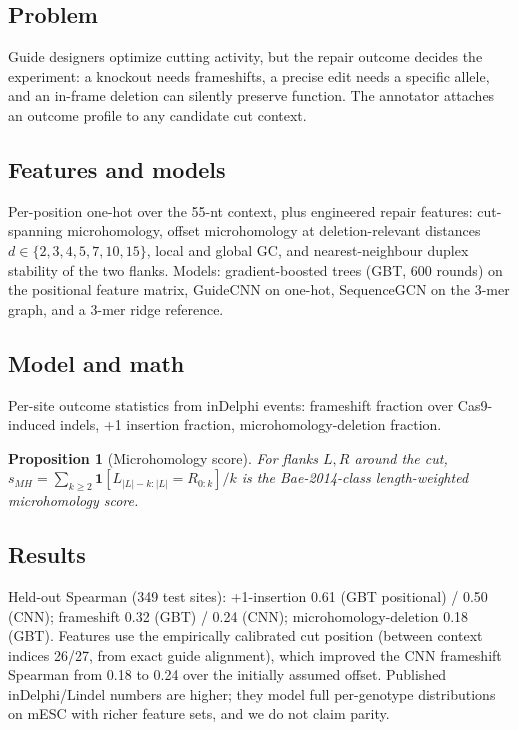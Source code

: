 \documentclass[12pt]{article}
\newtheorem{proposition}{Proposition}
\begin{document}
\subsection{Problem}
Guide designers optimize cutting activity, but the repair outcome decides the
experiment: a knockout needs frameshifts, a precise edit needs a specific
allele, and an in-frame deletion can silently preserve function. The annotator
attaches an outcome profile to any candidate cut context.
\subsection{Features and models}
Per-position one-hot over the 55-nt context, plus engineered repair features:
cut-spanning microhomology, offset microhomology at deletion-relevant
distances $d \in \{2,3,4,5,7,10,15\}$, local and global GC, and
nearest-neighbour duplex stability of the two flanks. Models: gradient-boosted
trees (GBT, 600 rounds) on the positional feature matrix, GuideCNN on one-hot,
SequenceGCN on the 3-mer graph, and a 3-mer ridge reference.
\subsection{Model and math}
Per-site outcome statistics from inDelphi events: frameshift fraction over
Cas9-induced indels, +1 insertion fraction, microhomology-deletion fraction.
\begin{proposition}[Microhomology score]
For flanks $L, R$ around the cut, $s_{MH} = \sum_{k \ge 2} \mathbf{1}[L_{|L|-k:|L|} = R_{0:k}]/k$
is the Bae-2014-class length-weighted microhomology score.
\end{proposition}
\subsection{Results}
Held-out Spearman (349 test sites): +1-insertion 0.61 (GBT positional) /
0.50 (CNN); frameshift 0.32 (GBT) / 0.24 (CNN); microhomology-deletion
0.18 (GBT). Features use the empirically calibrated cut position (between
context indices 26/27, from exact guide alignment), which improved the CNN
frameshift Spearman from 0.18 to 0.24 over the initially assumed offset.
Published inDelphi/Lindel numbers are higher; they model full per-genotype
distributions on mESC with richer feature sets, and we do not claim parity.
\end{document}
